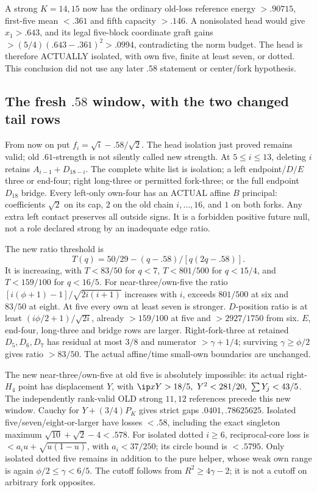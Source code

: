 A strong \(K=14,15\) now has the ordinary old-loss reference
energy \(>.90715\), first-five mean \(<.361\) and
fifth capacity \(>.146\).
A nonisolated head would give \(x_1>.643\), and its legal five-block
coordinate graft gains \(>(5/4)(.643-.361)^2>.0994\),
contradicting the norm budget.
The head is therefore ACTUALLY isolated, with own five,
finite at least seven, or dotted. This conclusion did not use any
later \(.58\) statement or center/fork hypothesis.

\subsection{The fresh \(.58\) window, with the two changed tail rows}
\label{app:D18freshwindow}
From now on put \(f_i=\sqrt i-.58/\sqrt2\).
The head isolation just proved remains valid; old \(.61\)-strength
is not silently called new strength.
At \(5\leq i\leq13\), deleting \(i\) retains
\(A_{i-1}+D_{18-i}\).
The complete white list is isolation; a left endpoint/\(D/E\)
three or end-four; right long-three or permitted fork-three;
or the full endpoint \(D_{18}\) bridge.
Every left-only own-four has an ACTUAL affine \(B\) principal:
coefficients \(\sqrt2\) on its cap, \(2\) on the old chain
\(i,\ldots,16\), and \(1\) on both forks.
Any extra left contact preserves all outside signs.
It is a forbidden positive future null, not a role declared strong
by an inadequate edge ratio.

The new ratio threshold is
\[
 T(q)=50/29-(q-.58)/[q(2q-.58)].
\]
It is increasing, with \(T<83/50\) for \(q<7\),
\(T<801/500\) for \(q<15/4\), and \(T<159/100\) for \(q<16/5\).
For near-three/own-five the ratio
\([i(\phi+1)-1]/\sqrt{2i(i+1)}\) increases with \(i\),
exceeds \(801/500\) at six and \(83/50\) at eight.
At five every own at least seven is stronger.
\(D\)-position ratio is at least \((i\phi/2+1)/\sqrt{2i}\),
already \(>159/100\) at five and \(>2927/1750\) from six.
\(E\), end-four, long-three and bridge rows are larger.
Right-fork-three at retained \(D_5,D_6,D_7\) has residual
at most \(3/8\) and numerator \(>\gamma+1/4\);
surviving \(\gamma\geq\phi/2\) gives ratio \(>83/50\).
The actual affine/time small-own boundaries are unchanged.

The new near-three/own-five at old five is absolutely impossible:
its actual right-\(H_4\) point has displacement \(Y\), with
\(\ip xY>18/5,\ Y^2<281/20,\ \sum Y_j<43/5\).
The independently rank-valid OLD strong \(11,12\) references
precede this new window.
Cauchy for \(Y+(3/4)P_K\) gives strict gaps
\(.0401,.78625625\).
Isolated five/seven/eight-or-larger have losses \(<.58\),
including the exact singleton maximum
\(\sqrt{10}+\sqrt2-4<.578\).
For isolated dotted \(i\geq6\), reciprocal-core loss is
\(<a_iu+\sqrt{u(1-u)}\), with \(a_i<37/250\);
its circle bound is \(<.5795\).
Only isolated dotted five remains in addition to the pure helper,
whose weak own range is again \(\phi/2\leq\gamma<6/5\).
The cutoff follows from \(R^2\geq4\gamma-2\);
it is not a cutoff on arbitrary fork opposites.

